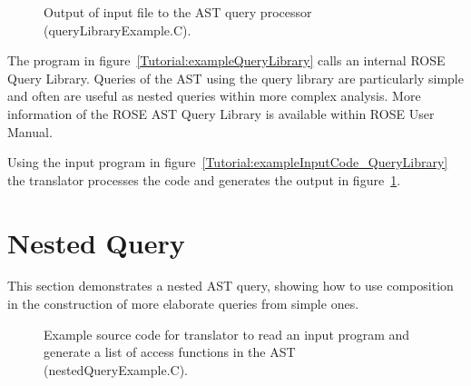 \begin{figure}[!h]
{\indent
{\mySmallFontSize


\begin{latexonly}
   
\end{latexonly}

\begin{htmlonly}
   
\end{htmlonly}

}
}
\caption{Output of input file to the AST query processor (queryLibraryExample.C).}
\label{Tutorial:exampleOutput_QueryLibrary}
\end{figure}

The program in figure~\ref{Tutorial:exampleQueryLibrary} calls 
an internal ROSE Query Library.  Queries of the AST using the query library are
particularly simple and often are useful as nested queries within more complex analysis.
More information of the ROSE AST Query Library is available within ROSE User Manual.

   Using the input program in figure~\ref{Tutorial:exampleInputCode_QueryLibrary}
the translator processes the code and generates the output in 
figure~\ref{Tutorial:exampleOutput_QueryLibrary}.


\section{Nested Query}

   This section demonstrates a nested AST query, showing how to use 
composition in the construction of more elaborate queries from simple ones.

\begin{figure}[!h]
{\indent
{\mySmallFontSize


\begin{latexonly}
   
\end{latexonly}

\begin{htmlonly}
   
\end{htmlonly}

}
}
\caption{Example source code for translator to read an input program and 
         generate a list of access functions in the AST (nestedQueryExample.C).}
\label{Tutorial:exampleNestedQuery}
\end{figure}

